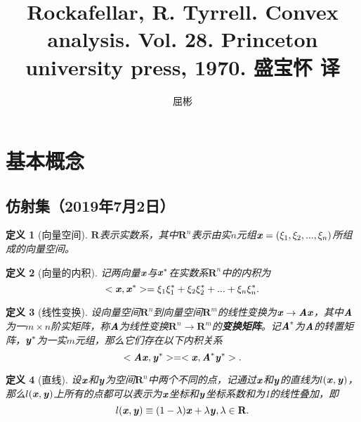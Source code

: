 \documentclass[a4paper,11pt,oneside]{article}
\newtheorem{definition}{定义}[section]
\begin{document}
	\title{Rockafellar, R. Tyrrell. Convex analysis. Vol. 28. Princeton university press, 1970. 盛宝怀 译}
	\author{屈彬}
	\maketitle
	
	\section{基本概念}
		\subsection{仿射集（2019年7月2日）}
			\begin{definition}[向量空间]
				$\textbf{R}$表示实数系，其中$\textbf{R}^{n}$表示由实$n$元组$\textbf{\textit{x}}=(\xi_{1},\xi_{2},...,\xi_{n})$所组成的向量空间。
			\end{definition}
			\begin{definition}[向量的内积]
				记两向量$\textbf{\textit{x}}$与$\textbf{\textit{x}}^{*}$在实数系$\textbf{R}^{n}$中的内积为
				$$<\textbf{\textit{x}},\textbf{\textit{x}}^{*}>=\xi_{1}\xi_{1}^{*}+\xi_{2}\xi_{2}^{*}+...+\xi_{n}\xi_{n}^{*}.$$
			\end{definition}
			\begin{definition}[线性变换]
				设向量空间$\textbf{R}^{n}$到向量空间$\textbf{R}^{m}$的线性变换为$\textbf{\textit{x}} \rightarrow \textbf{\textit{A}} \textbf{\textit{x}}$，其中$\textbf{\textit{A}}$为一$m\times n$阶实矩阵，称$\textbf{\textit{A}}$为线性变换$\textbf{R}^{n} \rightarrow \textbf{R}^{m}$的\textbf{变换矩阵}。记$\textbf{\textit{A}}^{*}$为$\textbf{\textit{A}}$的转置矩阵，$\textbf{\textit{y}}^{*}$为一实$m$元组，那么它们存在以下内积关系
				$$<\textbf{\textit{A}}\textbf{\textit{x}}, \textbf{\textit{y}}^{*}> = <\textbf{\textit{x}}, \textbf{\textit{A}}^{*} \textbf{\textit{y}}^{*}>.$$
			\end{definition}
			\begin{definition}[直线]
				设$\textbf{\textit{x}}$和$\textbf{\textit{y}}$为空间$\textbf{R}^{n}$中两个不同的点，记通过$\textbf{\textit{x}}$和$\textbf{\textit{y}}$的直线为$l(\textbf{\textit{x}},\textbf{\textit{y}})$，那么$l(\textbf{\textit{x}},\textbf{\textit{y}})$上所有的点都可以表示为$\textbf{\textit{x}}$坐标和$\textbf{\textit{y}}$坐标系数和为1的线性叠加，即
				$$l(\textbf{\textit{x}},\textbf{\textit{y}})\equiv(1-\lambda)\textbf{\textit{x}}+\lambda\textbf{\textit{y}}, \lambda \in \textbf{R}.$$
			\end{definition}
\end{document}
